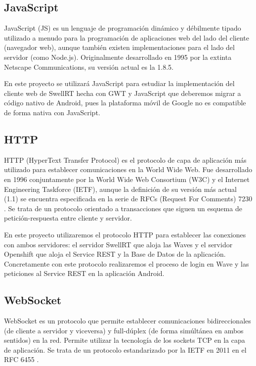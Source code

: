     \subsection{JavaScript}\label{ssec:javascript}
    
	JavaScript \cite{ref:javascript} (JS) es un lenguaje de programación dinámico y débilmente tipado utilizado a menudo para la programación de aplicaciones web del lado del cliente (navegador web), aunque también existen implementaciones para el lado del servidor (como Node.js). Originalmente desarrollado en 1995 por la extinta Netscape Communications, su versión actual es la 1.8.5.  
	
	En este proyecto se utilizará JavaScript para estudiar la implementación del cliente web de SwellRT hecha con GWT y JavaScript que deberemos migrar a código nativo de Android, pues la plataforma móvil de Google no es compatible de forma nativa con JavaScript.
    
    \subsection{HTTP}\label{ssec:http}
    
	HTTP \cite{ref:http} (HyperText Transfer Protocol) es el protocolo de capa de aplicación más utilizado para establecer comunicaciones en la World Wide Web. Fue desarrollado en 1996 conjuntamente por la World Wide Web Consortium (W3C) y el Internet Engineering Taskforce (IETF), aunque la definición de su versión más actual (1.1) se encuentra especificada en la serie de RFCs (Request For Comments) 7230 \cite{ref:http}. Se trata de un protocolo orientado a transacciones que siguen un esquema de petición-respuesta entre cliente y servidor. 
	
	En este proyecto utilizaremos el protocolo HTTP para establecer las conexiones con ambos servidores: el servidor SwellRT que aloja las Waves y el servidor Openshift que aloja el Service REST y la Base de Datos de la aplicación. Concretamente con este protocolo realizaremos el proceso de login en Wave y las peticiones al Service REST en la aplicación Android.
    
    \subsection{WebSocket}\label{ssec:websocket}
    
	WebSocket \cite{ref:webSocket_ref} es un protocolo que permite establecer comunicaciones bidireccionales (de cliente a servidor y viceversa) y full-dúplex (de forma simúltánea en ambos sentidos) en la red. Permite utilizar la tecnología de los sockets TCP en la capa de aplicación.  Se trata de un protocolo estandarizado por la IETF en 2011 en el RFC 6455 \cite{ref:webSocket_ref}. 
	
